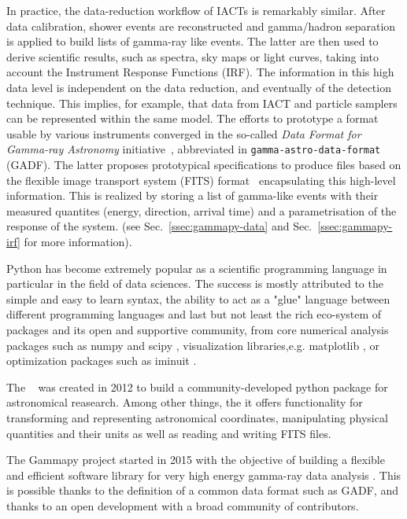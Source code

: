 In practice, the data-reduction workflow of IACTs is remarkably similar.
After data calibration, shower events are reconstructed and
gamma/hadron separation is applied to build lists of gamma-ray like events.
The latter are then used to derive scientific results, such as spectra, sky maps
or light curves, taking into account the Instrument Response Functions (IRF).
The information in this high data level is independent on
the data reduction, and eventually of the detection technique. This implies,
for example, that data from IACT and particle samplers can be represented
within the same model. The efforts to prototype a format usable by various instruments
converged in the so-called \textit{Data Format for Gamma-ray Astronomy}
initiative~\citep{gadf_proc, gadf_universe}, abbreviated in
\texttt{gamma-astro-data-format} (GADF). The latter proposes prototypical
specifications to produce files based on the flexible image transport system
(FITS) format~\citep{fits} encapsulating this high-level information. This is
realized by storing a list of gamma-like events with their measured quantites
(energy, direction, arrival time) and a parametrisation of the response of the
system. (see Sec.~\ref{ssec:gammapy-data} and Sec.~\ref{ssec:gammapy-irf} for
more information).

Python has become extremely popular as a scientific programming language
in particular in the field of data sciences. The success is
mostly attributed to the simple and easy to learn syntax, the ability to act as
a "glue" language between different programming languages and last but not least
the rich eco-system of packages and its open and supportive community, from
core numerical analysis packages such as numpy \citep{numpy} and
scipy \citep{2020SciPy-NMeth}, visualization libraries,e.g. matplotlib \citep{matplotlib},
or optimization packages such as iminuit \citep{iminuit}.

The \astropy~\citep{astropy} was created in 2012 to build a community-developed
 python package for astronomical reasearch. Among other things, the it offers functionality for
transforming and representing astronomical coordinates, manipulating physical quantities
and their units as well as reading and writing FITS files.

The Gammapy project started in 2015 with the objective of building a flexible and
efficient software library for very high energy gamma-ray data analysis \citep{gammapy_2015}.
This is possible thanks to the definition of a common data format such as GADF, and thanks to
an open development with a broad community of contributors.

